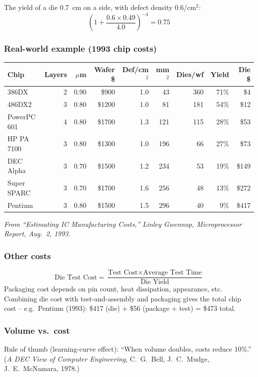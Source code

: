 \begin{eg}
The yield of a die 0.7~cm on a side, with defect density 0.6/cm$^2$:
\[
  \left(1 + \frac{0.6 \times 0.49}{4.0}\right)^{-4} = 0.75
\]
\end{eg}

\subsubsection{Real-world example (1993 chip costs)}
\begin{center}
\footnotesize
\begin{tabular}{@{}lrrrrrrrr@{}}
\toprule
Chip & Layers & $\mu$m & Wafer \$ & Def/cm$^2$ &
mm$^2$ & Dies/wf & Yield & Die \$ \\
\midrule
386DX      & 2 & 0.90 & \$900  & 1.0 & 43  & 360 & 71\% & \$4 \\
486DX2     & 3 & 0.80 & \$1200 & 1.0 & 81  & 181 & 54\% & \$12 \\
PowerPC 601& 4 & 0.80 & \$1700 & 1.3 & 121 & 115 & 28\% & \$53 \\
HP PA 7100 & 3 & 0.80 & \$1300 & 1.0 & 196 & 66  & 27\% & \$73 \\
DEC Alpha  & 3 & 0.70 & \$1500 & 1.2 & 234 & 53  & 19\% & \$149 \\
Super SPARC& 3 & 0.70 & \$1700 & 1.6 & 256 & 48  & 13\% & \$272 \\
Pentium    & 3 & 0.80 & \$1500 & 1.5 & 296 & 40  & 9\%  & \$417 \\
\bottomrule
\end{tabular}
\end{center}
\emph{From ``Estimating IC Manufacturing Costs,'' Linley Gwennap,
Microprocessor Report, Aug.\ 2, 1993.}

\subsubsection{Other costs}
\[
  \text{Die Test Cost} = \frac{\text{Test Cost} \times \text{Average Test
  Time}}{\text{Die Yield}}
\]
Packaging cost depends on pin count, heat dissipation, appearance, etc.
Combining die cost with test-and-assembly and packaging gives the total
chip cost -- e.g.\ Pentium (1993): \$417 (die) + \$56 (package + test) =
\$473 total.

\subsubsection{Volume vs.\ cost}
\begin{note}
Rule of thumb (learning-curve effect): ``When volume doubles, costs reduce
10\%.''\; (\emph{A DEC View of Computer Engineering}, C.~G.~Bell,
J.~C.~Mudge, J.~E.~McNamara, 1978.)
\end{note}

